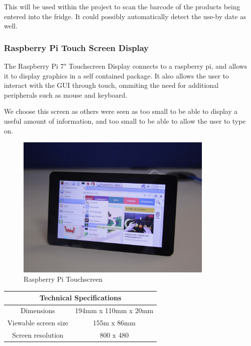\documentclass[10pt]{article}
\begin{document}
This will be used within the project to scan the barcode of the products being entered into the fridge. It could possibly automatically detect the use-by date as well.

\subsubsection{Raspberry Pi Touch Screen Display}

The Raspberry Pi 7" Touchscreen Display connects to a raspberry pi, and allows it to display graphics in a self contained package. It also allows the user to interact with the GUI through touch, ommiting the need for additional peripherals such as mouse and keyboard.

We choose this screen as others were seen as too small to be able to display a useful amount of information, and too small to be able to allow the user to type on.

\begin{figure}[h]
\centering
\caption{Raspberry Pi Touchscreen}
\label{Raspberry Pi Touchscreen}
\includegraphics[height=7cm]{images/pi-touchscreen.jpg}
\end{figure}

\begin{center}
	\begin{tabular}{ | c | c | }
		\hline
	 	\multicolumn{2}{|c|}{Technical Specifications} \\ \hline
		Dimensions 		& 194mm x 110mm x 20mm \\ \hline
		Viewable screen size 	& 155m x 86mm \\ \hline
		Screen resolution	& 800 x 480 \\ \hline
	\end{tabular}
\end{center}
\end{document}
